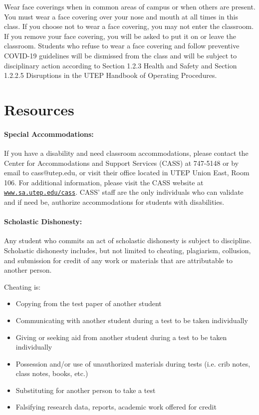 \documentclass[12pt]{scrartcl}
\begin{document}
Wear face coverings when in common areas of campus or when others are present. 
You must wear a face covering over your nose and mouth at all times in this class. 
If you choose not to wear a face covering, you may not enter the classroom. 
If you remove your face covering, you will be asked to put it on or leave the classroom. 
Students who refuse to wear a face covering and follow preventive COVID-19 guidelines will be dismissed from the class and will be subject to disciplinary action according to Section 1.2.3 Health and Safety and Section 1.2.2.5 Disruptions in the UTEP Handbook of Operating Procedures.


\section{Resources}

\paragraph{Special Accommodations: }
If you have a disability and need classroom accommodations, please contact the Center for Accommodations and Support Services (CASS) at 747-5148 or by email to cass@utep.edu, or visit their office located in UTEP Union East, Room 106. For additional information, please visit the CASS website at \href{http://www.sa.utep.edu/cass}{\texttt{www.sa.utep.edu/cass}}. CASS’ staff are the only individuals who can validate and if need be, authorize accommodations for students with disabilities.


\paragraph{Scholastic Dishonesty: }
Any student who commits an act of scholastic dishonesty is subject to discipline. Scholastic dishonesty includes, but not limited to cheating, plagiarism, collusion, and submission for credit of any work or materials that are attributable to another person.

Cheating is:
\begin{itemize}
\item Copying from the test paper of another student
\item Communicating with another student during a test to be taken individually
\item Giving or seeking aid from another student during a test to be taken individually
\item Possession and/or use of unauthorized materials during tests (i.e. crib notes, class notes, books, etc.)
\item Substituting for another person to take a test
\item Falsifying research data, reports, academic work offered for credit
\end{itemize}
\end{document}
